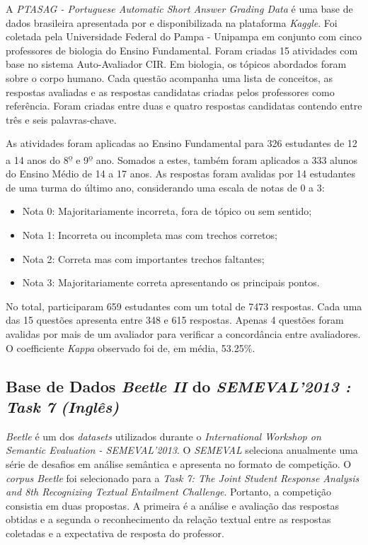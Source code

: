 A \textit{PTASAG - Portuguese Automatic Short Answer Grading Data} é uma base de dados brasileira apresentada por \cite{galhardi2018} e disponibilizada na plataforma \textit{Kaggle}. Foi coletada pela Universidade Federal do Pampa - Unipampa em conjunto com cinco professores de biologia do Ensino Fundamental. Foram criadas 15 atividades com base no sistema Auto-Avaliador CIR. Em biologia, os tópicos abordados foram sobre o corpo humano. Cada questão acompanha uma lista de conceitos, as respostas avaliadas e as respostas candidatas criadas pelos professores como referência. Foram criadas entre duas e quatro respostas candidatas contendo entre três e seis palavras-chave.

As atividades foram aplicadas ao Ensino Fundamental para 326 estudantes de 12 a 14 anos do 8\textsuperscript{\b{o}} e 9\textsuperscript{\b{o}} ano. Somados a estes, também foram aplicados a 333 alunos do Ensino Médio de 14 a 17 anos. As respostas foram avalidas por 14 estudantes de uma turma do último ano, considerando uma escala de notas de 0 a 3:

\begin{itemize}
\item Nota 0: Majoritariamente incorreta, fora de tópico ou sem sentido;
\item Nota 1: Incorreta ou incompleta mas com trechos corretos;
\item Nota 2: Correta mas com importantes trechos faltantes;
\item Nota 3: Majoritariamente correta apresentando os principais pontos.
\end{itemize}

No total, participaram 659 estudantes com um total de 7473 respostas. Cada uma das 15 questões apresenta entre 348 e 615 respostas. Apenas 4 questões foram avalidas por mais de um avaliador para verificar a concordância entre avaliadores. O coefficiente \textit{Kappa} observado foi de, em média, 53.25\%.

\subsection{Base de Dados \textit{Beetle II} do \textit{SEMEVAL'2013 : Task 7} \textit{(Inglês)}}
\label{beetle-db}

\textit{Beetle} \cite{dzikovska2012} é um dos \textit{datasets} utilizados durante o \textit{International Workshop on Semantic Evaluation - SEMEVAL'2013}. O \textit{SEMEVAL} seleciona anualmente uma série de desafios em análise semântica e apresenta no formato de competição. O \textit{corpus Beetle} foi selecionado para a \textit{Task 7: The Joint Student Response Analysis and 8th Recognizing Textual Entailment Challenge}. Portanto, a competição consistia em duas propostas. A primeira é a análise e avaliação das respostas obtidas e a segunda o reconhecimento da relação textual entre as respostas coletadas e a expectativa de resposta do professor.

